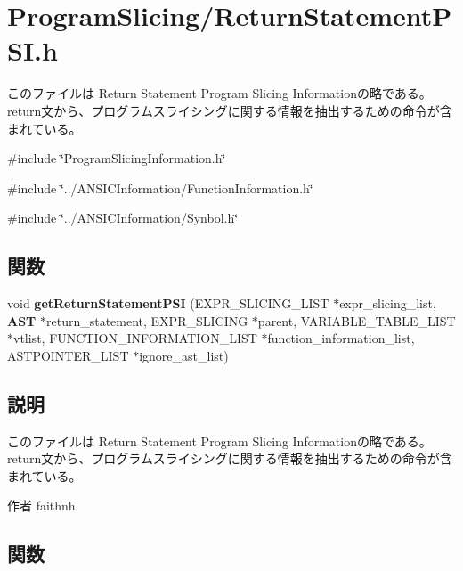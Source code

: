 \section{ProgramSlicing/ReturnStatementPSI.h}
\label{ReturnStatementPSI_8h}


このファイルは Return Statement Program Slicing Informationの略である。 return文から、プログラムスライシングに関する情報を抽出するための命令が含まれている。  


{\ttfamily \#include \char`\"{}ProgramSlicingInformation.h\char`\"{}}\par
{\ttfamily \#include \char`\"{}../ANSICInformation/FunctionInformation.h\char`\"{}}\par
{\ttfamily \#include \char`\"{}../ANSICInformation/Synbol.h\char`\"{}}\par
\subsection*{関数}
\begin{DoxyCompactItemize}
\item 
void {\bf getReturnStatementPSI} (EXPR\_\-SLICING\_\-LIST $\ast$expr\_\-slicing\_\-list, {\bf AST} $\ast$return\_\-statement, EXPR\_\-SLICING $\ast$parent, VARIABLE\_\-TABLE\_\-LIST $\ast$vtlist, FUNCTION\_\-INFORMATION\_\-LIST $\ast$function\_\-information\_\-list, ASTPOINTER\_\-LIST $\ast$ignore\_\-ast\_\-list)
\end{DoxyCompactItemize}


\subsection{説明}
このファイルは Return Statement Program Slicing Informationの略である。 return文から、プログラムスライシングに関する情報を抽出するための命令が含まれている。 \begin{DoxyAuthor}{作者}
faithnh 
\end{DoxyAuthor}


\subsection{関数}
